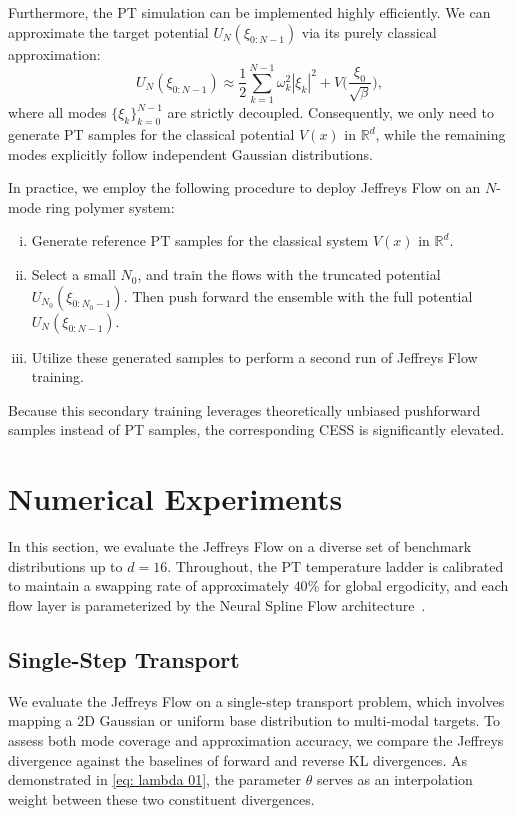 \documentclass[%
 reprint,
 amsmath,amssymb,
 aps,
 pre,
]{revtex4-2}
\newcommand{\setzero}{\setlength{\itemsep}{0pt}}
\begin{document}
Furthermore, the PT simulation can be implemented highly efficiently. We can approximate the target potential $U_N(\xi_{0:N-1})$ via its purely classical approximation:
\begin{equation*}
	U_N(\xi_{0:N-1}) \approx \frac{1}{2} \sum_{k=1}^{N-1} \omega_k^2 |\xi_k|^2 + V\bigg(\frac{\xi_0}{\sqrt{\beta}}\bigg),
\end{equation*}
where all modes $\{\xi_k\}_{k=0}^{N-1}$ are strictly decoupled. Consequently, we only need to generate PT samples for the classical potential $V(x)$ in $\mathbb{R}^d$, while the remaining modes explicitly follow independent Gaussian distributions.

In practice, we employ the following procedure to deploy Jeffreys Flow on an $N$-mode ring polymer system:
\begin{enumerate}[(i)]
	\setzero
	\item Generate reference PT samples for the classical system $V(x)$ in $\mathbb{R}^d$.
	\item Select a small $N_0$, and train the flows with the truncated potential $U_{N_0}(\xi_{0:N_0-1})$. Then push forward the ensemble with the full potential $U_N(\xi_{0:N-1})$.
	\item Utilize these generated samples to perform a second run of Jeffreys Flow training.
\end{enumerate}
Because this secondary training leverages theoretically unbiased pushforward samples instead of PT samples, the corresponding CESS is significantly elevated.

\mbox{}

\section{Numerical Experiments}
\label{section: numerical experiments}

In this section, we evaluate the Jeffreys Flow on a diverse set of benchmark distributions up to $d=16$. Throughout, the PT temperature ladder is calibrated to maintain a swapping rate of approximately $40\%$ for global ergodicity, and each flow layer is parameterized by the Neural Spline Flow architecture~\cite{durkan2019neural}.

\subsection{Single-Step Transport}
\label{subsection: single step transport}

We evaluate the Jeffreys Flow on a single-step transport problem, which involves mapping a 2D Gaussian or uniform base distribution to multi-modal targets. To assess both mode coverage and approximation accuracy, we compare the Jeffreys divergence against the baselines of forward and reverse KL divergences. As demonstrated in \eqref{eq: lambda 01}, the parameter $\theta$ serves as an interpolation weight between these two constituent divergences.
\end{document}
